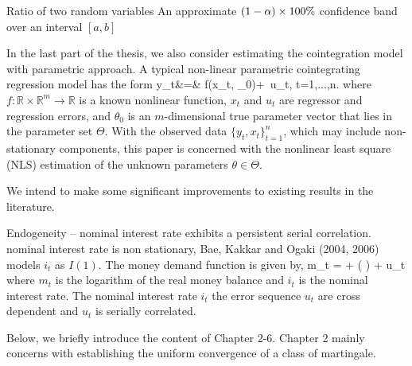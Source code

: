 Ratio of two random variables
An approximate $(1 - \alpha) \times 100\%$ confidence band over an interval $[a,b]$










In the last part of the thesis, we also consider estimating the cointegration model with parametric approach. A typical non-linear parametric cointegrating
regression model has the form
 \be y_t&=&
f(x_t, \theta_0)+\,  u_t, \quad t=1,...,n.
\ee
where  $f:\mathbb{R} \times \mathbb{R}^m \rightarrow \mathbb{R}$ is a known nonlinear function,
$x_t$ and  $u_t$ are regressor and regression errors, and   $\theta_0$ is an $m$-dimensional true parameter vector that lies in the parameter set $\Theta$. With the observed data $\{y_t, x_t\}_{t=1}^n$, which may include non-stationary components, this paper is concerned with the nonlinear least square (NLS) estimation of the unknown parameters $\theta\in \Theta$.

We intend to make some significant improvements to existing results in the literature.

Endogeneity -- nominal interest rate exhibits a persistent serial correlation. nominal interest rate is non stationary, Bae, Kakkar and Ogaki (2004, 2006) models $i_t$ as $I(1)$. The money demand function is given by,
\be
m_t = \al + \beta \log \big (  \big ) + u_t
\ee
where $m_t$ is the logarithm of the real money balance and $i_t$ is the nominal interest rate. The nominal interest rate $i_t$ the error sequence $u_t$ are cross dependent and $u_t$ is serially correlated.



Below, we briefly introduce the content of Chapter 2-6.
Chapter 2 mainly concerns with establishing the uniform convergence of a class of martingale.




